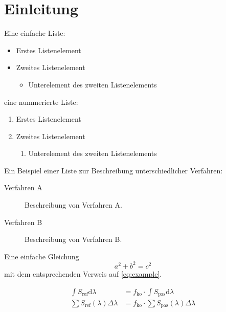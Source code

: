 \chapter[Einleitung]{Einleitung}

Eine einfache Liste:
\begin{itemize}
  \item Erstes Listenelement
  \item Zweites Listenelement
  \begin{itemize}
    \item Unterelement des zweiten Listenelements
  \end{itemize}
\end{itemize}

eine nummerierte Liste:
\begin{enumerate}%
  \item Erstes Listenelement
  \item Zweites Listenelement
  \begin{enumerate}
    \item Unterelement des zweiten Listenelements
  \end{enumerate}
\end{enumerate}

Ein Beispiel einer Liste zur Beschreibung unterschiedlicher Verfahren:
\begin{description}%
  \item[Verfahren A] Beschreibung von Verfahren A.
  \item[Verfahren B] Beschreibung von Verfahren B.
\end{description}

\noindent Eine einfache Gleichung
\begin{equation}
    a^2 + b^2 = c^2
    \label{eq:example}
\end{equation}
mit dem entsprechenden Verweis auf \ref{eq:example}.

\begin{subequations} 
  \begin{align}
      \int S_\mathrm{ref}\mathrm{d}\lambda &= f_\mathrm{ko} \cdot \int S_\mathrm{pas}\mathrm{d}\lambda \label{eq:referencefactor1} \\
      \sum S_\mathrm{ref}(\lambda)\Delta\lambda &= f_\mathrm{ko} \cdot \sum S_\mathrm{pas}(\lambda)\Delta\lambda \label{eq:referencefactor2}
  \end{align}
\end{subequations}

